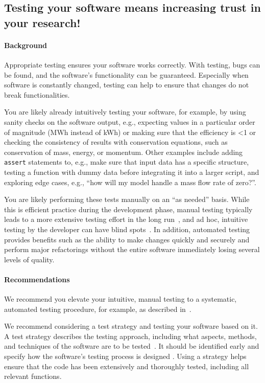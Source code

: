 \subsection{Testing your software means increasing trust in your research!}\label{sec:testing}


\paragraph{Background} Appropriate testing ensures your software works correctly. With testing, bugs can be found, and the software's functionality can be guaranteed. Especially when software is constantly changed, testing can help to ensure that changes do not break functionalities. 

You are likely already intuitively testing your software, for example, by using sanity checks on the software output, e.g., expecting values in a particular order of magnitude (MWh instead of kWh) or making sure that the efficiency is <1 or checking the consistency of results with conservation equations, such as conservation of mass, energy, or momentum. Other examples include adding \texttt{assert} statements to, e.g., make sure that input data has a specific structure, testing a function with dummy data before integrating it into a larger script, and exploring edge cases, e.g., ``how will my model handle a mass flow rate of zero?''.

You are likely performing these tests manually on an ``as needed'' basis. While this is efficient practice during the development phase, manual testing typically leads to a more extensive testing effort in the long run~\cite{patrick_software_2016}, and ad hoc, intuitive testing by the developer can have blind spots~\cite{mischke_automated_2022}. In addition, automated testing provides benefits such as the ability to make changes quickly and securely and perform major refactorings without the entire software immediately losing several levels of quality.

\paragraph{Recommendations} 
We recommend you elevate your intuitive, manual testing to a systematic, automated testing procedure, for example, as described in~\cite{mischke_automated_2022}. 

We recommend considering a test strategy and testing your software based on it. A test strategy describes the testing approach, including what aspects, methods, and techniques of the software are to be tested~\cite{drlsoftwareinitiative}. It should be identified early and specify how the software's testing process is designed \cite{drlsoftwareinitiative}. 
Using a strategy helps ensure that the code has been extensively and thoroughly tested, including all relevant functions. \par

